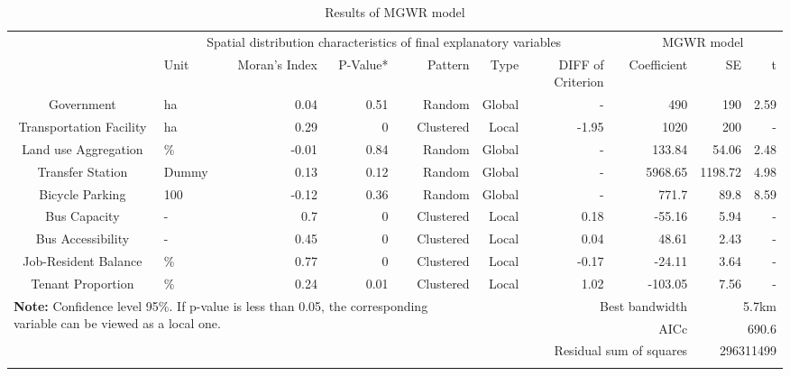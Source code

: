 \begin{sidewaystable}[htbp]
	\centering
	\caption{Results of MGWR model}
	\label{tab:chp2:ResultMGWR}
	\small
	\renewcommand{\arraystretch}{1.25} %
	
	\begin{tabular}{clrrrrrrrrr}
		\Xhline{1.5pt}
		\multicolumn{1}{c}{\multirow{2}[4]{*}{Variable}} & \multicolumn{6}{c}{Spatial distribution characteristics of final explanatory variables} & & \multicolumn{3}{c}{MGWR model} \\
		
		\cmidrule{2-7}\cmidrule{9-11}
		
		& \multicolumn{1}{p{3em}}{Unit} & \multicolumn{1}{p{4em}}{Moran's Index} & P-Value* & Pattern & Type & \multicolumn{1}{p{4em}}{DIFF of Criterion} & & Coefficient & SE & t \\
		
		\cmidrule{1-7}\cmidrule{9-11}
		
		Government & ha & 0.04 & 0.51 & Random & Global &- & & 490 & 190 & 2.59 \\
		Transportation Facility & ha & 0.29 & 0 & Clustered & Local & -1.95 & & 1020 & 200 & - \\
		Land use Aggregation & \% & -0.01 & 0.84 & Random & Global & - & & 133.84 & 54.06 & 2.48 \\
		Transfer Station & Dummy & 0.13 & 0.12 & Random & Global & - & & 5968.65 & 1198.72 & 4.98 \\
		Bicycle Parking & 100 & -0.12 & 0.36 & Random & Global & - & & 771.7 & 89.8 & 8.59 \\
		Bus Capacity & - & 0.7 & 0 & Clustered & Local & 0.18  & & -55.16 & 5.94  & - \\
		Bus Accessibility & - & 0.45 & 0 &  Clustered & Local & 0.04 & & 48.61 & 2.43 & - \\
		Job-Resident Balance & \% & 0.77 & 0 & Clustered & Local & -0.17 & & -24.11 & 3.64 & - \\
		Tenant Proportion & \% & 0.24 & 0.01 & Clustered & Local & 1.02 & & -103.05 & 7.56 & - \\
		
		\midrule
		
		\multicolumn{5}{l}{\multirow{3}[2]{30em}{\textbf{Note:} Confidence level 95\%. If p-value is less than 0.05, the corresponding variable can be viewed as a local one.}} & \multicolumn{4}{r}{Best bandwidth} & \multicolumn{2}{r}{5.7km} \\
		\multicolumn{5}{l}{} & \multicolumn{4}{r}{AICc} & \multicolumn{2}{r}{690.6} \\
		\multicolumn{5}{l}{} & \multicolumn{4}{r}{Residual sum of squares} & \multicolumn{2}{r}{296311499} \\
		
		\Xhline{1.5pt}
	\end{tabular}%
\end{sidewaystable}%


